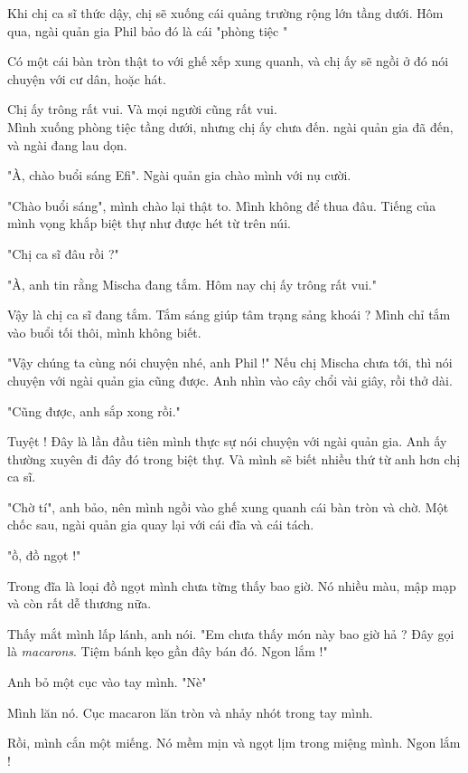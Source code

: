Khi chị ca sĩ thức dậy, chị sẽ xuống cái quảng trường rộng lớn tầng dưới. Hôm qua, ngài quản gia Phil bảo đó là cái "phòng tiệc "

Có một cái bàn tròn thật to với ghế xếp xung quanh, và chị ấy sẽ ngồi ở đó nói chuyện với cư dân, hoặc hát.

Chị ấy trông rất vui. Và mọi người cũng rất vui.\\


Mình xuống phòng tiệc tầng dưới, nhưng chị ấy chưa đến. ngài quản gia đã đến, và ngài đang lau dọn.

"À, chào buổi sáng Efi". Ngài quản gia chào mình với nụ cười.

"Chào buổi sáng", mình chào lại thật to. Mình không để thua đâu. Tiếng của mình vọng khắp biệt thự như được hét từ trên núi.

"Chị ca sĩ đâu rồi ?"

"À, anh tin rằng Mischa đang tắm. Hôm nay chị ấy trông rất vui."

Vậy là chị ca sĩ đang tắm. Tắm sáng giúp tâm trạng sảng khoái ? Mình chỉ tắm vào buổi tối thôi, mình không biết.

"Vậy chúng ta cùng nói chuyện nhé, anh Phil !" Nếu chị Mischa chưa tới, thì nói chuyện với ngài quản gia cũng được. Anh nhìn vào cây chổi vài giây, rồi thở dài.

"Cũng được, anh sắp xong rồi."

Tuyệt ! Đây là lần đầu tiên mình thực sự nói chuyện với ngài quản gia. Anh ấy thường xuyên đi đây đó trong biệt thự. Và mình sẽ biết nhiều thứ từ anh hơn chị ca sĩ.

"Chờ tí", anh bảo, nên mình ngồi vào ghế xung quanh cái bàn tròn và chờ. Một chốc sau, ngài quản gia quay lại với cái đĩa và cái tách.

"ồ, đồ ngọt !"

Trong đĩa là loại đồ ngọt mình chưa từng thấy bao giờ. Nó nhiều màu, mập mạp và còn rất dễ thương nữa.

Thấy mắt mình lấp lánh, anh nói. "Em chưa thấy món này bao giờ hả ? Đây gọi là \textit{macarons}. Tiệm bánh kẹo gần đây bán đó. Ngon lắm !"

Anh bỏ một cục vào tay mình. "Nè"

Mình lăn nó. Cục macaron lăn tròn và nhảy nhót trong tay mình.

Rồi, mình cắn một miếng. Nó mềm mịn và ngọt lịm trong miệng mình. Ngon lắm !

